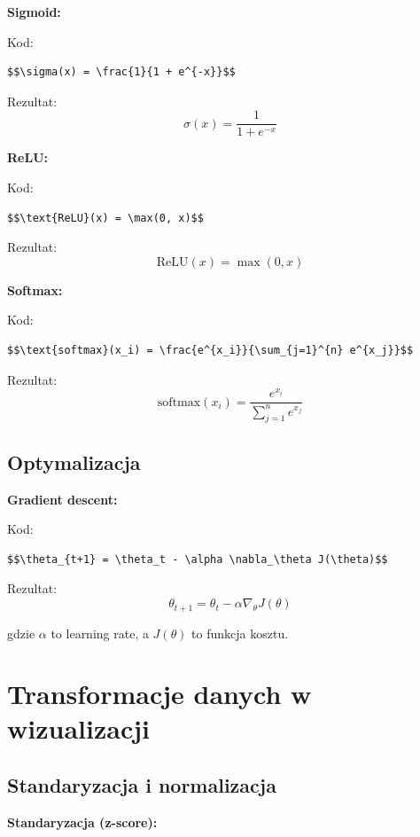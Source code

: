 \documentclass[
  polish,
  letterpaper,
  DIV=11,
  numbers=noendperiod]{scrreprt}
\begin{document}
\textbf{Sigmoid:}

Kod:

\begin{verbatim}
$$\sigma(x) = \frac{1}{1 + e^{-x}}$$
\end{verbatim}

Rezultat: \[\sigma(x) = \frac{1}{1 + e^{-x}}\]

\textbf{ReLU:}

Kod:

\begin{verbatim}
$$\text{ReLU}(x) = \max(0, x)$$
\end{verbatim}

Rezultat: \[\text{ReLU}(x) = \max(0, x)\]

\textbf{Softmax:}

Kod:

\begin{verbatim}
$$\text{softmax}(x_i) = \frac{e^{x_i}}{\sum_{j=1}^{n} e^{x_j}}$$
\end{verbatim}

Rezultat:
\[\text{softmax}(x_i) = \frac{e^{x_i}}{\sum_{j=1}^{n} e^{x_j}}\]

\subsection{Optymalizacja}\label{optymalizacja}

\textbf{Gradient descent:}

Kod:

\begin{verbatim}
$$\theta_{t+1} = \theta_t - \alpha \nabla_\theta J(\theta)$$
\end{verbatim}

Rezultat: \[\theta_{t+1} = \theta_t - \alpha \nabla_\theta J(\theta)\]

gdzie \(\alpha\) to learning rate, a \(J(\theta)\) to funkcja kosztu.

\section{Transformacje danych w
wizualizacji}\label{transformacje-danych-w-wizualizacji}

\subsection{Standaryzacja i
normalizacja}\label{standaryzacja-i-normalizacja}

\textbf{Standaryzacja (z-score):}
\end{document}
